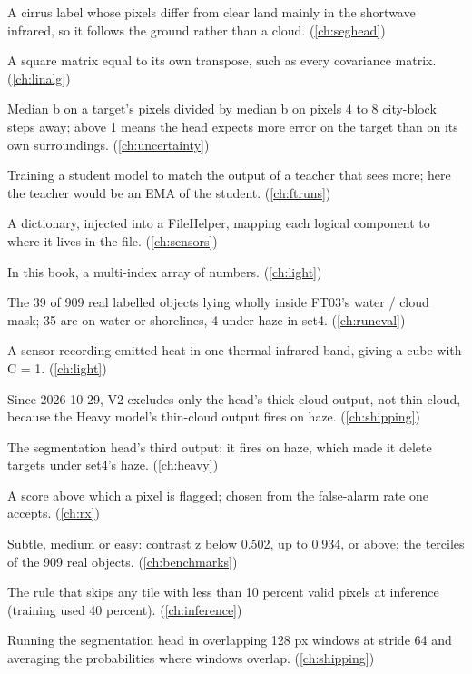 \begin{description}[style=nextline,leftmargin=1.2em,font=\normalfont\bfseries]
\item[Surface-driven label] A cirrus label whose pixels differ from clear land mainly in the shortwave infrared, so it follows the ground rather than a cloud. (\cref{ch:seghead})
\item[Symmetric matrix] A square matrix equal to its own transpose, such as every covariance matrix. (\cref{ch:linalg})
\item[Target / ring ratio] Median b on a target's pixels divided by median b on pixels 4 to 8 city-block steps away; above 1 means the head expects more error on the target than on its own surroundings. (\cref{ch:uncertainty})
\item[Teacher-student training] Training a student model to match the output of a teacher that sees more; here the teacher would be an EMA of the student. (\cref{ch:ftruns})
\item[Template (file)] A dictionary, injected into a FileHelper, mapping each logical component to where it lives in the file. (\cref{ch:sensors})
\item[Tensor] In this book, a multi-index array of numbers. (\cref{ch:light})
\item[The 39] The 39 of 909 real labelled objects lying wholly inside FT03's water / cloud mask; 35 are on water or shorelines, 4 under haze in set4. (\cref{ch:runeval})
\item[Thermal sensor] A sensor recording emitted heat in one thermal-infrared band, giving a cube with C = 1. (\cref{ch:light})
\item[Thick-cloud rule] Since 2026-10-29, V2 excludes only the head's thick-cloud output, not thin cloud, because the Heavy model's thin-cloud output fires on haze. (\cref{ch:shipping})
\item[Thin-cloud channel] The segmentation head's third output; it fires on haze, which made it delete targets under set4's haze. (\cref{ch:heavy})
\item[Threshold] A score above which a pixel is flagged; chosen from the false-alarm rate one accepts. (\cref{ch:rx})
\item[Tier] Subtle, medium or easy: contrast z below 0.502, up to 0.934, or above; the terciles of the 909 real objects. (\cref{ch:benchmarks})
\item[Tile validity filter] The rule that skips any tile with less than 10 percent valid pixels at inference (training used 40 percent). (\cref{ch:inference})
\item[Tiled segmentation] Running the segmentation head in overlapping 128 px windows at stride 64 and averaging the probabilities where windows overlap. (\cref{ch:shipping})

\end{description}
